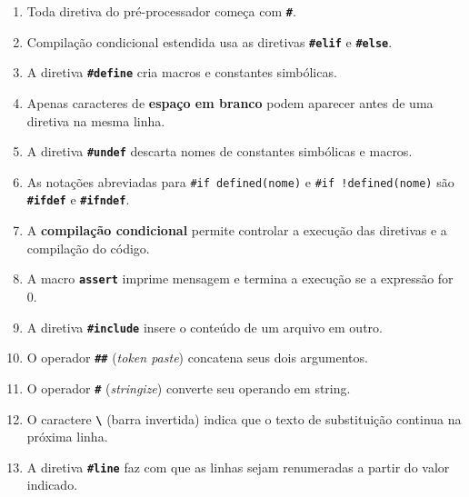 \documentclass[12pt,a4paper]{article}
\begin{document}
\begin{respostabox}
\begin{enumerate}[label=\textbf{\alph*)}]

\item Toda diretiva do pré-processador começa com \textbf{\texttt{\#}}.

\item Compilação condicional estendida usa as diretivas \textbf{\texttt{\#elif}}
e \textbf{\texttt{\#else}}.

\item A diretiva \textbf{\texttt{\#define}} cria macros e constantes simbólicas.

\item Apenas caracteres de \textbf{espaço em branco} podem aparecer antes de uma
diretiva na mesma linha.

\item A diretiva \textbf{\texttt{\#undef}} descarta nomes de constantes simbólicas e macros.

\item As notações abreviadas para \texttt{\#if defined(nome)} e
\texttt{\#if !defined(nome)} são \textbf{\texttt{\#ifdef}} e
\textbf{\texttt{\#ifndef}}.

\item A \textbf{compilação condicional} permite controlar a execução das diretivas
e a compilação do código.

\item A macro \textbf{\texttt{assert}} imprime mensagem e termina a execução se
a expressão for 0.

\item A diretiva \textbf{\texttt{\#include}} insere o conteúdo de um arquivo em outro.

\item O operador \textbf{\texttt{\#\#}} (\textit{token paste}) concatena seus dois argumentos.

\item O operador \textbf{\texttt{\#}} (\textit{stringize}) converte seu operando em string.

\item O caractere \textbf{\texttt{\textbackslash}} (barra invertida) indica que o
texto de substituição continua na próxima linha.

\item A diretiva \textbf{\texttt{\#line}} faz com que as linhas sejam renumeradas
a partir do valor indicado.

\end{enumerate}


\end{respostabox}
\end{document}

